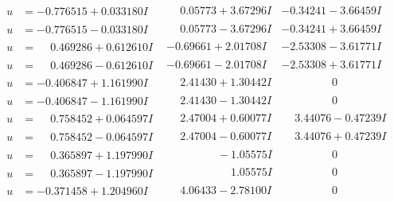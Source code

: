 \documentclass[1p]{elsarticle_modified}
\theoremstyle{definition}
\begin{document}
$$\begin{array}{c|c|c}
\begin{aligned}
u &= -0.776515 + 0.033180 I\end{aligned}
 & \phantom{-}0.05773 + 3.67296 I & -0.34241 - 3.66459 I \\ \hline\begin{aligned}
u &= -0.776515 - 0.033180 I\end{aligned}
 & \phantom{-}0.05773 - 3.67296 I & -0.34241 + 3.66459 I \\ \hline\begin{aligned}
u &= \phantom{-}0.469286 + 0.612610 I\end{aligned}
 & -0.69661 + 2.01708 I & -2.53308 - 3.61771 I \\ \hline\begin{aligned}
u &= \phantom{-}0.469286 - 0.612610 I\end{aligned}
 & -0.69661 - 2.01708 I & -2.53308 + 3.61771 I \\ \hline\begin{aligned}
u &= -0.406847 + 1.161990 I\end{aligned}
 & \phantom{-}2.41430 + 1.30442 I & \phantom{-0.000000 } 0 \\ \hline\begin{aligned}
u &= -0.406847 - 1.161990 I\end{aligned}
 & \phantom{-}2.41430 - 1.30442 I & \phantom{-0.000000 } 0 \\ \hline\begin{aligned}
u &= \phantom{-}0.758452 + 0.064597 I\end{aligned}
 & \phantom{-}2.47004 + 0.60077 I & \phantom{-}3.44076 - 0.47239 I \\ \hline\begin{aligned}
u &= \phantom{-}0.758452 - 0.064597 I\end{aligned}
 & \phantom{-}2.47004 - 0.60077 I & \phantom{-}3.44076 + 0.47239 I \\ \hline\begin{aligned}
u &= \phantom{-}0.365897 + 1.197990 I\end{aligned}
 & \phantom{-0.000000 } -1.05575 I & \phantom{-0.000000 } 0 \\ \hline\begin{aligned}
u &= \phantom{-}0.365897 - 1.197990 I\end{aligned}
 & \phantom{-0.000000 -}1.05575 I & \phantom{-0.000000 } 0 \\ \hline\begin{aligned}
u &= -0.371458 + 1.204960 I\end{aligned}
 & \phantom{-}4.06433 - 2.78100 I & \phantom{-0.000000 } 0 \\ \hline\begin{aligned}

\end{aligned}
\end{array}$$
\end{document}
